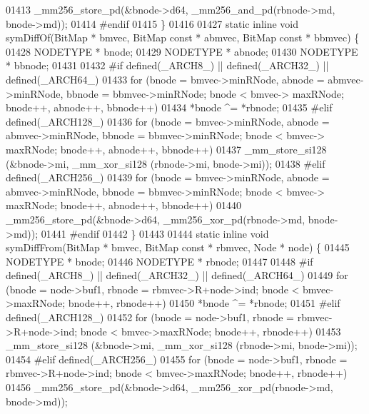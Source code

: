 \begin{DoxyCode}
{01413                 \_mm256\_store\_pd(&bnode->d64, \_mm256\_and\_pd(rbnode->md, bnode->md));
01414 \textcolor{preprocessor}{#endif}
01415 \}
01416 
01427 \textcolor{keyword}{static} \textcolor{keyword}{inline} \textcolor{keywordtype}{void} symDiffOf(BitMap * bmvec, BitMap \textcolor{keyword}{const} * abmvec, BitMap \textcolor{keyword}{const} * bbmvec) \{
01428         NODETYPE * bnode;
01429         NODETYPE * abnode;
01430         NODETYPE * bbnode;
01431 
01432 \textcolor{preprocessor}{#if defined(\_ARCH8\_) || defined(\_ARCH32\_) || defined(\_ARCH64\_)}
01433         \textcolor{keywordflow}{for} (bnode = bmvec->minRNode, abnode = abmvec->minRNode, bbnode = bbmvec->minRNode; bnode < bmvec->
      maxRNode; bnode++, abnode++, bbnode++)
01434                 *bnode ^= *rbnode;
01435 \textcolor{preprocessor}{#elif defined(\_ARCH128\_)}
01436         \textcolor{keywordflow}{for} (bnode = bmvec->minRNode, abnode = abmvec->minRNode, bbnode = bbmvec->minRNode; bnode < bmvec->
      maxRNode; bnode++, abnode++, bbnode++)
01437                 \_mm\_store\_si128 (&bnode->mi, \_mm\_xor\_si128 (rbnode->mi, bnode->mi));
01438 \textcolor{preprocessor}{#elif defined(\_ARCH256\_)}
01439         \textcolor{keywordflow}{for} (bnode = bmvec->minRNode, abnode = abmvec->minRNode, bbnode = bbmvec->minRNode; bnode < bmvec->
      maxRNode; bnode++, abnode++, bbnode++)
01440                 \_mm256\_store\_pd(&bnode->d64, \_mm256\_xor\_pd(rbnode->md, bnode->md));
01441 \textcolor{preprocessor}{#endif}
01442 \}
01443 
01444 \textcolor{keyword}{static} \textcolor{keyword}{inline} \textcolor{keywordtype}{void} symDiffFrom(BitMap * bmvec, BitMap \textcolor{keyword}{const} * rbmvec, Node * node) \{
01445         NODETYPE * bnode;
01446         NODETYPE * rbnode;
01447 
01448 \textcolor{preprocessor}{#if defined(\_ARCH8\_) || defined(\_ARCH32\_) || defined(\_ARCH64\_)}
01449         \textcolor{keywordflow}{for} (bnode = node->buf1, rbnode = rbmvec->R+node->ind; bnode < bmvec->maxRNode; bnode++, rbnode++)
01450                 *bnode ^= *rbnode;
01451 \textcolor{preprocessor}{#elif defined(\_ARCH128\_)}
01452         \textcolor{keywordflow}{for} (bnode = node->buf1, rbnode = rbmvec->R+node->ind; bnode < bmvec->maxRNode; bnode++, rbnode++)
01453                 \_mm\_store\_si128 (&bnode->mi, \_mm\_xor\_si128 (rbnode->mi, bnode->mi));
01454 \textcolor{preprocessor}{#elif defined(\_ARCH256\_)}
01455         \textcolor{keywordflow}{for} (bnode = node->buf1, rbnode = rbmvec->R+node->ind; bnode < bmvec->maxRNode; bnode++, rbnode++)
01456                 \_mm256\_store\_pd(&bnode->d64, \_mm256\_xor\_pd(rbnode->md, bnode->md));
}
\end{DoxyCode}

